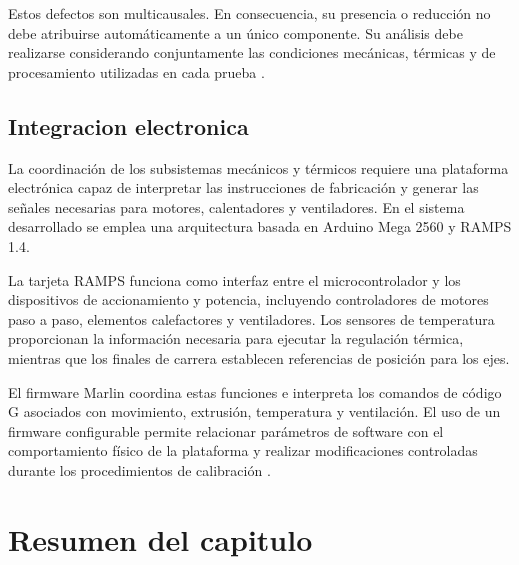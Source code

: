 Estos defectos son multicausales. En consecuencia, su presencia o reducción no debe atribuirse automáticamente a un único componente. Su análisis debe realizarse considerando conjuntamente las condiciones mecánicas, térmicas y de procesamiento utilizadas en cada prueba \cite{kechagias_2022}.

\subsection{Integracion electronica}
La coordinación de los subsistemas mecánicos y térmicos requiere una plataforma electrónica capaz de interpretar las instrucciones de fabricación y generar las señales necesarias para motores, calentadores y ventiladores. En el sistema desarrollado se emplea una arquitectura basada en Arduino Mega 2560 y RAMPS 1.4.

La tarjeta RAMPS funciona como interfaz entre el microcontrolador y los dispositivos de accionamiento y potencia, incluyendo controladores de motores paso a paso, elementos calefactores y ventiladores. Los sensores de temperatura proporcionan la información necesaria para ejecutar la regulación térmica, mientras que los finales de carrera establecen referencias de posición para los ejes.

El firmware Marlin coordina estas funciones e interpreta los comandos de código G asociados con movimiento, extrusión, temperatura y ventilación. El uso de un firmware configurable permite relacionar parámetros de software con el comportamiento físico de la plataforma y realizar modificaciones controladas durante los procedimientos de calibración \cite{marlin_firmware}.

\section{Resumen del capitulo}